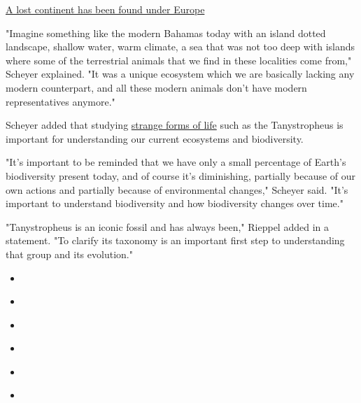 \href{/2019/09/23/world/lost-continent-europe-scn-trnd/index.html}{A
lost continent has been found under Europe}

"Imagine something like the modern Bahamas today with an island dotted
landscape, shallow water, warm climate, a sea that was not too deep with
islands where some of the terrestrial animals that we find in these
localities come from," Scheyer explained. "It was a unique ecosystem
which we are basically lacking any modern counterpart, and all these
modern animals don't have modern representatives anymore."

Scheyer added that studying
\href{https://www.cnn.com/2020/07/06/world/tiny-bug-slayer-fossil-scn-trnd/index.html}{strange
forms of life} such as the Tanystropheus is important for understanding
our current ecosystems and biodiversity.

"It's important to be reminded that we have only a small percentage of
Earth's biodiversity present today, and of course it's diminishing,
partially because of our own actions and partially because of
environmental changes," Scheyer said. "It's important to understand
biodiversity and how biodiversity changes over time."

"Tanystropheus is an iconic fossil and has always been," Rieppel added
in a statement. "To clarify its taxonomy is an important first step to
understanding that group and its evolution."

\begin{itemize}
\item
\end{itemize}

\begin{itemize}
\item
\end{itemize}

\begin{itemize}
\item
\end{itemize}

\begin{itemize}
\item
\end{itemize}

\begin{itemize}
\item
\end{itemize}

\begin{itemize}
\item
\end{itemize}

